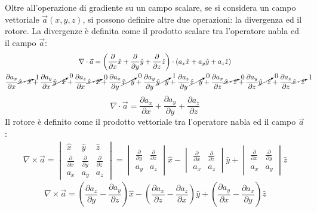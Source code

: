 \documentclass{article}
\numberwithin{equation}{subsection}
\begin{document}
Oltre all'operazione di gradiente su un campo scalare, se si considera un campo vettoriale $\vec{a}(x,y,z)$, si possono definire altre due operazioni: la divergenza ed il 
rotore. La divergenze è definita come il prodotto scalare tra l'operatore nabla ed il campo $\vec{a}$:
\begin{gather*}
    {\nabla}\cdot\vec{a}=\displaystyle\left(\frac{\partial}{\partial x}\hat{x}+\frac{\partial}{\partial y}\hat{y}+\frac{\partial}{\partial z}\hat z\right)\cdot\left(a_x\hat{x}+a_y\hat{y}+a_z\hat{z}\right)\\
    \displaystyle\frac{\partial a_x}{\partial x}\cancelto{1}{\hat{x}\cdot\hat{x}}+\frac{\partial a_y}{\partial x}\cancelto{0}{\hat{y}\cdot\hat{x}}+\frac{\partial a_z}{\partial x}\cancelto{0}{\hat{z}\cdot\hat{x}}+
    \frac{\partial a_x}{\partial y}\cancelto{0}{\hat{x}\cdot\hat{y}}+\frac{\partial a_y}{\partial y}\cancelto{1}{\hat{y}\cdot\hat{y}}+\frac{\partial a_z}{\partial y}\cancelto{0}{\hat{z}\cdot\hat{y}}+
    \frac{\partial a_x}{\partial z}\cancelto{0}{\hat{x}\cdot\hat{z}}+\frac{\partial a_y}{\partial z}\cancelto{0}{\hat{y}\cdot\hat{z}}+\frac{\partial a_z}{\partial z}\cancelto{1}{\hat{z}\cdot\hat{z}}
\end{gather*}
\begin{equation}
    {\nabla}\cdot\vec{a}=\displaystyle\frac{\partial a_x}{\partial x}+\frac{\partial a_y}{\partial y}+\frac{\partial a_z}{\partial z}
\end{equation}
Il rotore è definito come il prodotto vettoriale tra l'operatore nabla ed il campo $\vec{a}$:
\begin{gather*}
    {\nabla}\times\vec{a}=
    \begin{vmatrix}
        \hat{x} & \hat{y} & \hat{z} \\
        \displaystyle\frac{\partial}{\partial x} & \displaystyle\frac{\partial}{\partial y} & \displaystyle\frac{\partial}{\partial z}\\
        a_x & a_y & a_z
    \end{vmatrix}=
    \begin{vmatrix}
        \displaystyle\frac{\partial}{\partial y} & \displaystyle\frac{\partial }{\partial z}\\
        a_y & a_z
    \end{vmatrix}\hat{x}-
    \begin{vmatrix}
        \displaystyle\frac{\partial}{\partial x} & \displaystyle\frac{\partial}{\partial z}\\
        a_x & a_z
    \end{vmatrix}\hat{y}+
    \begin{vmatrix}
        \displaystyle\frac{\partial}{\partial x} & \displaystyle\frac{\partial}{\partial y}\\
        a_x & a_y
    \end{vmatrix}\hat{z}
\end{gather*}
\begin{equation}
    {\nabla}\times\vec{a}=\left(\displaystyle\frac{\partial a_z}{\partial y}-\frac{\partial a_y}{\partial z}\right)\hat{x}-\left(\frac{\partial a_x}{\partial z}-\frac{\partial a_z}{\partial x}\right)\hat{y}+\left(\frac{\partial a_y}{\partial x}-\frac{\partial a_x}{\partial y}\right)\hat{z}
\end{equation}
\end{document}
